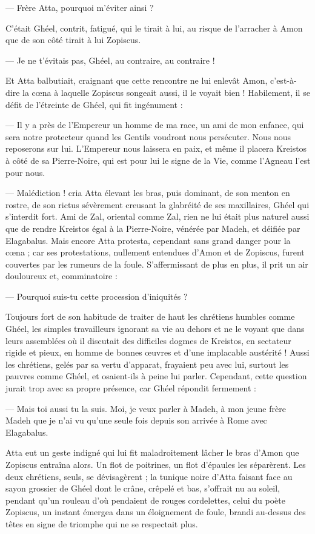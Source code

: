 \documentclass[a4paper, 11pt, oneside, polutonikogreek, french]{article}
\begin{document}
--- Frère Atta, pourquoi m'éviter ainsi ?

C'était Ghéel, contrit, fatigué, qui le tirait à lui, au risque de l'arracher à Amon que de son côté tirait à lui Zopiscus.

--- Je ne t'évitais pas, Ghéel, au contraire, au contraire !

Et Atta balbutiait, craignant que cette rencontre ne lui enlevât Amon, c'est-à-dire la cœna à laquelle Zopiscus songeait aussi, il le voyait bien ! Habilement, il se défit de l'étreinte de Ghéel, qui fit ingénument :

--- Il y a près de l'Empereur un homme de ma race, un ami de mon enfance, qui sera notre protecteur quand les Gentils voudront nous persécuter. Nous nous reposerons sur lui. L'Empereur nous laissera en paix, et même il placera Kreistos à côté de sa Pierre-Noire, qui est pour lui le signe de la Vie, comme l'Agneau l'est pour nous.

--- Malédiction ! cria Atta élevant les bras, puis dominant, de son menton en rostre, de son rictus sévèrement creusant la glabréité de ses maxillaires, Ghéel qui s'interdit fort. Ami de Zal, oriental comme Zal, rien ne lui était plus naturel aussi que de rendre Kreistos égal à la Pierre-Noire, vénérée par Madeh, et déifiée par Elagabalus. Mais encore Atta protesta, cependant sans grand danger pour la cœna ; car ses protestations, nullement entendues d'Amon et de Zopiscus, furent couvertes par les rumeurs de la foule. S'affermissant de plus en plus, il prit un air douloureux et, comminatoire :

--- Pourquoi suis-tu cette procession d'iniquités ?

Toujours fort de son habitude de traiter de haut les chrétiens humbles comme Ghéel, les simples travailleurs ignorant sa vie au dehors et ne le voyant que dans leurs assemblées où il discutait des difficiles dogmes de Kreistos, en sectateur rigide et pieux, en homme de bonnes œuvres et d'une implacable austérité ! Aussi les chrétiens, gelés par sa vertu d'apparat, frayaient peu avec lui, surtout les pauvres comme Ghéel, et osaient-ils à peine lui parler. Cependant, cette question jurait trop avec sa propre présence, car Ghéel répondit fermement :

--- Mais toi aussi tu la suis. Moi, je veux parler à Madeh, à mon jeune frère Madeh que je n'ai vu qu'une seule fois depuis son arrivée à Rome avec Elagabalus.

Atta eut un geste indigné qui lui fit maladroitement lâcher le bras d'Amon que Zopiscus entraîna alors. Un flot de poitrines, un flot d'épaules les séparèrent. Les deux chrétiens, seuls, se dévisagèrent ; la tunique noire d'Atta faisant face au sayon grossier de Ghéel dont le crâne, crêpelé et bas, s'offrait nu au soleil, pendant qu'un rouleau d'où pendaient de rouges cordelettes, celui du poète Zopiscus, un instant émergea dans un éloignement de foule, brandi au-dessus des têtes en signe de triomphe qui ne se respectait plus.
\end{document}
